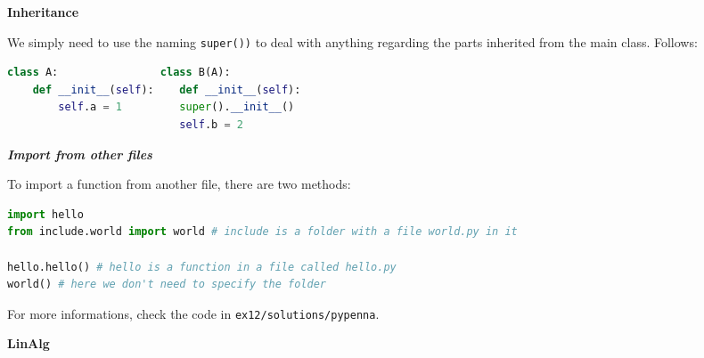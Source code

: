\documentclass[fontsize=8pt, a4paper, landscape, fleqn]{scrartcl}
\renewcommand{\subsection}[1]{%
    \noindent\colorbox{subsectioncolor}{%
        \parbox{\dimexpr\columnwidth-2\fboxsep}{\color{white}\textbf{#1}}}%
    \vspace{0.5mm}%
}
\renewcommand{\subsubsection}[1]{%
    \noindent\textbf{\textit{\color{subsectioncolor}#1}}%
    \vspace{1mm}%
}
\begin{document}
\begin{multicols*}{3}[\raggedcolumns]
    \subsection{Inheritance}
    We simply need to use the naming \lstinline{super())} to deal with anything regarding the parts inherited from the main class. Follows:
    
    \begin{lstlisting}[language=python, breaklines]
class A:                class B(A):
    def __init__(self):    def __init__(self):
        self.a = 1         super().__init__()
                           self.b = 2 \end{lstlisting}
    
    

    \subsubsection{Import from other files}
    To import a function from another file, there are two methods:
    
    \begin{lstlisting}[language=python, breaklines]
import hello
from include.world import world # include is a folder with a file world.py in it

hello.hello() # hello is a function in a file called hello.py
world() # here we don't need to specify the folder \end{lstlisting}

    For more informations, check the code in \lstinline{ex12/solutions/pypenna}.
    
    \subsection{LinAlg}

\end{multicols*}
\end{document}
